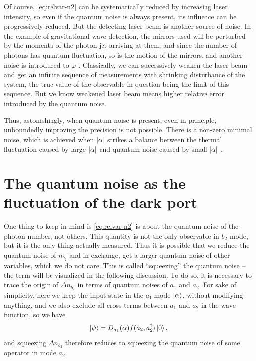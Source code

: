 \documentclass[hyperref, a4paper]{article}
\begin{document}
Of course, \eqref{eq:relvar-n2} can be systematically reduced by increasing laser intensity,
so even if the quantum noise is always present, 
its influence can be progressively reduced.
But the detecting laser beam is another source of noise.
In the example of gravitational wave detection,
the mirrors used will be perturbed by the momenta of the photon jet arriving at them,
and since the number of photons has quantum fluctuation,
so is the motion of the mirrors,
and another noise is introduced to $\varphi$ \cite{caves1980quantum,abadie_gravitational_2011}.
Classically,
we can successively weaken the laser beam 
and get an infinite sequence of measurements
with shrinking disturbance of the system,
the true value of the observable in question being the limit of this sequence.
But we know weakened laser beam means higher relative error 
introduced by the quantum noise.

Thus, astonishingly,
when quantum noise is present, 
even in principle, 
unboundedly improving the precision is not possible.
There is a non-zero minimal noise,
which is achieved when $\abs{\alpha}$ strikes a balance 
between the thermal fluctuation caused by large $\abs{\alpha}$
and quantum noise caused by small $\abs{\alpha}$ \cite{caves_quantum-mechanical_1981}.


\section{The quantum noise as the fluctuation of the dark port}\label{sec:dark-port-analysis}

One thing to keep in mind is \eqref{eq:relvar-n2} 
is about the quantum noise of the photon number, not others.
This quantity is not the only observable in $b_2$ mode,
but it is the only thing actually measured.
Thus it is possible that we reduce the quantum noise of $n_{b_2}$
and in exchange, get a larger quantum noise of other variables,
which we do not care.
This is called ``squeezing'' the quantum noise
-- the term will be visualized in the following discussion.
To do so, it is necessary to trace the origin of $\Delta{n_{b_2}}$ 
in terms of quantum noises of $a_1$ and $a_2$. 
For sake of simplicity,
here we keep the input state in the $a_1$ mode $\ket{\alpha}$,
without modifying anything,
and we also exclude all cross terms between $a_1$ and $a_2$ in the wave function, 
so we have 
\begin{equation}
    \ket{\psi} = D_{a_1}(\alpha) f(a_2, a_2^\dagger) \ket{0},
    \label{eq:coherent-plus-squeeze}
\end{equation}
and squeezing $\Delta{n_{b_2}}$ therefore reduces to squeezing the quantum noise of some operator in mode $a_2$.
\end{document}
